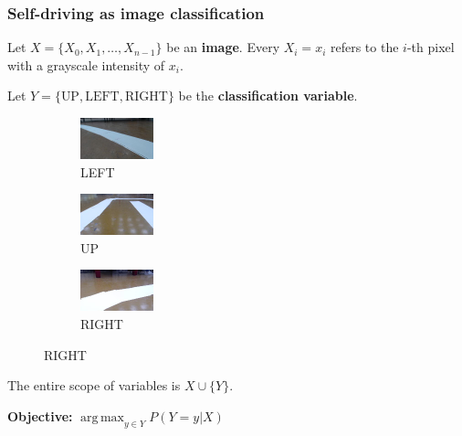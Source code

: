 \documentclass{beamer}
\DeclareMathOperator*{\argmax}{arg\,max}
\newcommand{\Left}{\text{LEFT}}
\newcommand{\Right}{\text{RIGHT}}
\newcommand{\Up}{\text{UP}}
\begin{document}
\begin{frame}
  \frametitle{Self-driving as image classification}

  Let $X=\{X_0,X_1,\ldots,X_{n-1}\}$ be an \textbf{image}. Every $X_i=x_i$ refers to the $i$-th
  pixel with a grayscale intensity of $x_i$.

  Let $Y=\{\Up,\Left,\Right\}$ be the \textbf{classification variable}.

  \begin{figure}
    \begin{subfigure}{0.3\linewidth}
      \centering\includegraphics{imgs/sample_left.png}
      \captionsetup{justification=centering}
      \caption*{LEFT}
    \end{subfigure}
    \begin{subfigure}{0.3\linewidth}
      \centering\includegraphics{imgs/sample_up.png}
      \captionsetup{justification=centering}
      \caption*{UP}
    \end{subfigure}
    \begin{subfigure}{0.3\linewidth}
      \centering\includegraphics{imgs/sample_right.png}
      \captionsetup{justification=centering}
      \caption*{RIGHT}
    \end{subfigure}
  \end{figure}

  The entire scope of variables is $X\cup \{Y\}$.

  \vfill\centering\textbf{Objective:} $\argmax_{y\in Y} P(Y=y|X)$
\end{frame}
\end{document}
